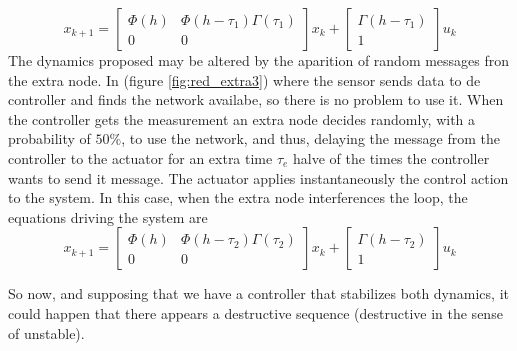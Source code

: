 \documentclass[nols]{tufte-handout}
\theoremstyle{definition}
\begin{document}
\[
    x_{k+1}=\begin{bmatrix}
        \Phi(h) & \Phi(h-\tau_1)\Gamma(\tau_1)\\
        0 & 0
    \end{bmatrix}x_k+
        \begin{bmatrix}
            \Gamma(h-\tau_1)\\
            1
        \end{bmatrix}u_k
\]
The dynamics proposed may be altered by the aparition of random messages fron the extra node. In (figure \ref{fig:red_extra3}) where the sensor sends data to de controller and finds the network availabe, so there is no problem to use it. When the controller gets the measurement an extra node decides randomly, with a probability of $50\%$, to use the network, and thus, delaying the message from the controller to the actuator for an extra time $\tau_{e}$ halve of the times the controller wants to send it message. The actuator applies instantaneously the control action to the system.
In this case, when the extra node interferences the loop, the equations driving the system are 
\[
    x_{k+1}=\begin{bmatrix}
        \Phi(h) & \Phi(h-\tau_2)\Gamma(\tau_2)\\
        0 & 0
    \end{bmatrix}x_k+
        \begin{bmatrix}
            \Gamma(h-\tau_2)\\
            1
        \end{bmatrix}u_k
\]

So now, and supposing that we have a controller that stabilizes both dynamics, it could happen that there appears a destructive sequence (destructive in the sense of unstable).
 
\end{document}
